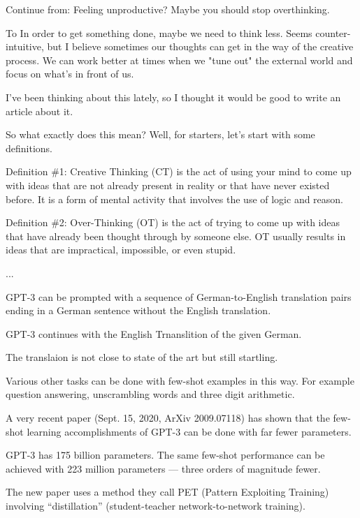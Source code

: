 {\vfill
{\color{red} Continue from: Feeling unproductive? Maybe you should stop overthinking.}

\vfill
To In order to get something done, maybe we need to think less. Seems counter-intuitive, but I believe sometimes our thoughts can get in the way of the creative process. We can work better at times when we "tune out" the external world and focus on what's in front of us.

\vfill
I've been thinking about this lately, so I thought it would be good to write an article about it. 

\vfill
So what exactly does this mean? Well, for starters, let's start with some definitions.

\vfill
Definition \#1: Creative Thinking (CT) is the act of using your mind to come up with ideas that are not already present in reality or that have never existed before. It is a form of mental activity that involves the use of logic and reason.

\vfill
Definition \#2: Over-Thinking (OT) is the act of trying to come up with ideas that have already been thought through by someone else. OT usually results in ideas that are impractical, impossible, or even stupid.

\vfill
...


GPT-3 can be prompted with a sequence of German-to-English translation pairs ending in a German sentence without the English translation.

\vfill
GPT-3 continues with the English Trnanslition of the given German.

\vfill
The translaion is not close to state of the art but still startling.

\vfill
Various other tasks can be done with few-shot examples in this way.  For example question answering, unscrambling words and three digit arithmetic.


A very recent paper (Sept. 15, 2020, ArXiv 2009.07118) has shown that the few-shot learning accomplishments of GPT-3 can be done with far fewer parameters.

\vfill
GPT-3 has 175 billion parameters.  The same few-shot performance can be achieved with 223 million parameters --- three orders of magnitude fewer.

\vfill
The new paper uses a method they call PET (Pattern Exploiting Training) involving ``distillation'' (student-teacher network-to-network training).


}

